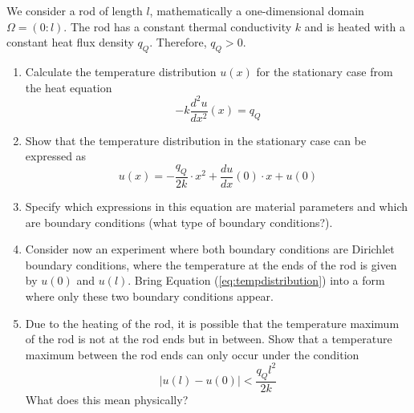 \documentclass[a4paper,12pt]{article}
\begin{document}
\head{}{}{}
 
\begin{task}{}

We consider a rod of length $l$, mathematically a one-dimensional domain $\Omega=(0:l)$. The rod has a constant thermal conductivity $k$ and is heated with a constant heat flux density $q_Q$. Therefore, $q_Q>0$.
 
\begin{enumerate}
 \item 
 Calculate the temperature distribution $u(x)$ for the stationary case from the heat equation
 $$
 -k \frac{d^2u}{dx^2}(x) = q_Q
 $$
 \item 
 Show that the temperature distribution in the stationary case can be expressed as
 \begin{equation}\label{eq:tempdistribution}
 u(x)=-\frac{q_Q}{2k} \cdot x^2 + \frac{du}{dx}(0) \cdot x + u(0)
 \end{equation}
 \item
 Specify which expressions in this equation are material parameters and which are boundary conditions (what type of boundary conditions?).
 \item
 Consider now an experiment where both boundary conditions are Dirichlet boundary conditions, where the temperature at the ends of the rod is given by $u(0)$ and $u(l)$. Bring Equation (\ref{eq:tempdistribution}) into a form where only these two boundary conditions appear.
 \item
 Due to the heating of the rod, it is possible that the temperature maximum of the rod is not at the rod ends but in between. Show that a temperature maximum between the rod ends can only occur under the condition
 $$
 \left|u(l)-u(0)\right|<\frac{q_Ql^2}{2k}
 $$
 What does this mean physically?
\end{enumerate}
\end{task}
\end{document}
